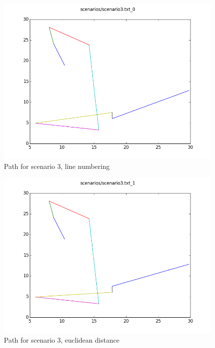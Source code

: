 \documentclass[paper=a4, fontsize=11pt]{scrartcl} %
\numberwithin{equation}{section} %
\numberwithin{figure}{section} %
\numberwithin{table}{section} %
\begin{document}
\begin{figure}[H]
	\centering
  	\includegraphics[width=1\textwidth]{results/3_0.png}
	\caption{Path for scenario 3, line numbering}
\end{figure}
\begin{figure}[H]
	\centering
  \includegraphics[width=1\textwidth]{results/3_1.png}
	\caption{Path for scenario 3, euclidean distance}
\end{figure}
\end{document}
